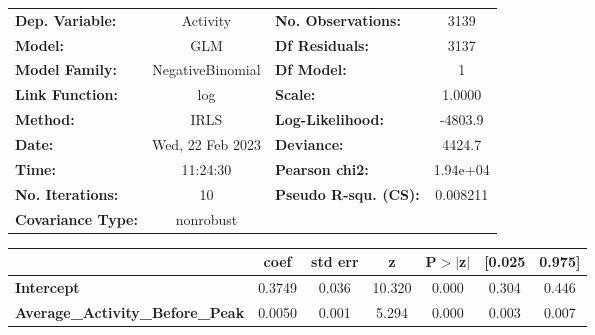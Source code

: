 \begin{center}
\begin{tabular}{lclc}
\toprule
\textbf{Dep. Variable:}                  &     Activity     & \textbf{  No. Observations:  } &     3139    \\
\textbf{Model:}                          &       GLM        & \textbf{  Df Residuals:      } &     3137    \\
\textbf{Model Family:}                   & NegativeBinomial & \textbf{  Df Model:          } &        1    \\
\textbf{Link Function:}                  &       log        & \textbf{  Scale:             } &    1.0000   \\
\textbf{Method:}                         &       IRLS       & \textbf{  Log-Likelihood:    } &   -4803.9   \\
\textbf{Date:}                           & Wed, 22 Feb 2023 & \textbf{  Deviance:          } &    4424.7   \\
\textbf{Time:}                           &     11:24:30     & \textbf{  Pearson chi2:      } &  1.94e+04   \\
\textbf{No. Iterations:}                 &        10        & \textbf{  Pseudo R-squ. (CS):} &  0.008211   \\
\textbf{Covariance Type:}                &    nonrobust     & \textbf{                     } &             \\
\bottomrule
\end{tabular}
\begin{tabular}{lcccccc}
                                         & \textbf{coef} & \textbf{std err} & \textbf{z} & \textbf{P$> |$z$|$} & \textbf{[0.025} & \textbf{0.975]}  \\
\midrule
\textbf{Intercept}                       &       0.3749  &        0.036     &    10.320  &         0.000        &        0.304    &        0.446     \\
\textbf{Average\_Activity\_Before\_Peak} &       0.0050  &        0.001     &     5.294  &         0.000        &        0.003    &        0.007     \\
\bottomrule
\end{tabular}
\end{center}